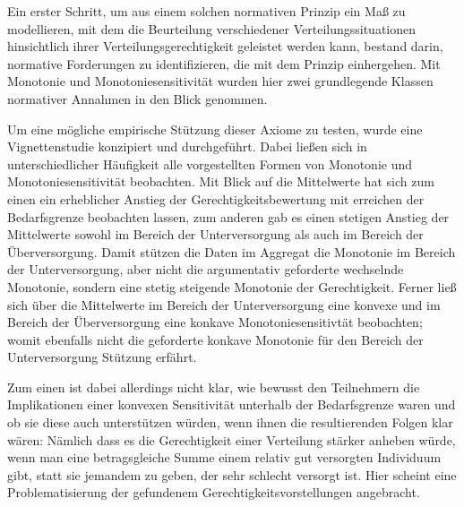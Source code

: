 \documentclass[a4paper]{thesis}
\begin{document}
Ein erster Schritt, um aus einem solchen normativen Prinzip ein Maß zu modellieren, mit dem die Beurteilung verschiedener Verteilungssituationen hinsichtlich ihrer Verteilungsgerechtigkeit geleistet werden kann, bestand darin, normative Forderungen zu identifizieren, die mit dem Prinzip einhergehen. Mit Monotonie und Monotoniesensitivität wurden hier zwei grundlegende Klassen normativer Annahmen in den Blick genommen.

Um eine mögliche empirische Stützung dieser Axiome zu testen, wurde eine Vignettenstudie konzipiert und durchgeführt. Dabei ließen sich in unterschiedlicher Häufigkeit alle vorgestellten Formen von Monotonie und Monotoniesensitivität beobachten. Mit Blick auf die Mittelwerte hat sich zum einen ein erheblicher Anstieg der Gerechtigkeitsbewertung mit erreichen der Bedarfsgrenze beobachten lassen, zum anderen gab es einen stetigen Anstieg der Mittelwerte sowohl im Bereich der Unterversorgung als auch im Bereich der Überversorgung. Damit stützen die Daten im Aggregat die Monotonie im Bereich der Unterversorgung, aber nicht die argumentativ geforderte wechselnde Monotonie, sondern eine stetig steigende Monotonie der Gerechtigkeit. Ferner ließ sich über die Mittelwerte im Bereich der Unterversorgung eine konvexe und im Bereich der Überversorgung eine konkave Monotoniesensitivtät beobachten; womit ebenfalls nicht die geforderte konkave Monotonie für den Bereich der Unterversorgung Stützung erfährt.

Zum einen ist dabei allerdings nicht klar, wie bewusst den Teilnehmern die Implikationen einer konvexen Sensitivität unterhalb der Bedarfsgrenze waren und ob sie diese auch unterstützen würden, wenn ihnen die resultierenden Folgen klar wären: Nämlich dass es die Gerechtigkeit einer Verteilung stärker anheben würde, wenn man eine betragsgleiche Summe einem relativ gut versorgten Individuum gibt, statt sie jemandem zu geben, der sehr schlecht versorgt ist. Hier scheint eine Problematisierung der gefundenem Gerechtigkeitsvorstellungen angebracht.
\end{document}
